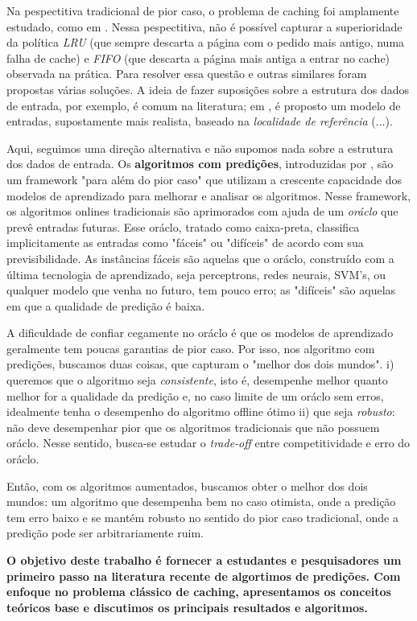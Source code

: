  Na pespectitiva tradicional de pior caso, o problema de caching foi amplamente estudado, como em \textcite{Achlioptas00}. Nessa pespectitiva, não é possível capturar a superioridade da política \emph{LRU} (que sempre descarta a página com o pedido mais antigo, numa falha de cache) e \emph{FIFO} (que descarta a página mais antiga a entrar no cache) observada na prática. Para resolver essa questão e outras similares foram propostas várias soluções. A ideia de fazer suposições sobre a estrutura dos dados de entrada, por exemplo, é comum na literatura; em \textcite{Albers02}, é proposto um modelo de entradas, supostamente mais realista, baseado na \emph{localidade de referência} (...).

 Aqui, seguimos uma direção alternativa e não supomos nada sobre a estrutura dos dados de entrada. Os \textbf{algoritmos com predições}, introduzidas por \textcite{Lykouris18}, são um framework "para além do pior caso" que utilizam a crescente capacidade dos modelos de aprendizado para melhorar e analisar os algoritmos. Nesse framework, os algoritmos onlines tradicionais são aprimorados com ajuda de um \emph{oráclo} que prevê entradas futuras. Esse oráclo, tratado como caixa-preta, classifica implicitamente as entradas como "fáceis" ou "difíceis" de acordo com sua previsibilidade. As instâncias fáceis são aquelas que o oráclo, construído com a última tecnologia de aprendizado, seja perceptrons, redes neurais, SVM's, ou qualquer modelo que venha no futuro, tem pouco erro; as "difíceis" são aquelas em que a qualidade de predição é baixa. 

 A dificuldade de confiar cegamente no oráclo é que os modelos de aprendizado geralmente tem poucas garantias de pior caso. Por isso, nos algoritmo com predições, buscamos duas coisas, que capturam o "melhor dos dois mundos". i) queremos que o algoritmo seja \emph{consistente}, isto é, desempenhe melhor quanto melhor for a qualidade da predição e, no caso limite de um oráclo sem erros, idealmente tenha o desempenho do algoritmo offline ótimo ii) que seja \emph{robusto}: não deve desempenhar pior que os algoritmos tradicionais que não possuem oráclo. Nesse sentido, busca-se estudar o \emph{trade-off} entre competitividade e erro do oráclo.

Então, com os algoritmos aumentados, buscamos obter o melhor dos dois mundos: um algoritmo que desempenha bem no caso otimista, onde a predição tem erro baixo e se mantém robusto no sentido do pior caso tradicional, onde a predição pode ser arbitrariamente ruim. 


\textbf{O objetivo deste trabalho é fornecer a estudantes e pesquisadores um primeiro passo na literatura recente de algortimos de predições. Com enfoque no problema clássico de caching, apresentamos os conceitos teóricos base e discutimos os principais resultados e algoritmos.}


